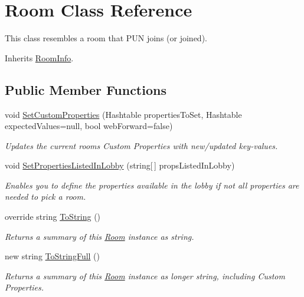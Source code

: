 \hypertarget{class_room}{}\section{Room Class Reference}
\label{class_room}


This class resembles a room that P\+UN joins (or joined).  




Inherits \hyperlink{class_room_info}{Room\+Info}.

\subsection*{Public Member Functions}
\begin{DoxyCompactItemize}
\item 
void \hyperlink{class_room_a9f8ac164f4f24be4140221b72792250a}{Set\+Custom\+Properties} (Hashtable properties\+To\+Set, Hashtable expected\+Values=null, bool web\+Forward=false)
\begin{DoxyCompactList}\small\item\em Updates the current room\textquotesingle{}s Custom Properties with new/updated key-\/values. \end{DoxyCompactList}\item 
void \hyperlink{class_room_af3c714b645bb569f4b7f060a985dbf1a}{Set\+Properties\+Listed\+In\+Lobby} (string\mbox{[}$\,$\mbox{]} props\+Listed\+In\+Lobby)
\begin{DoxyCompactList}\small\item\em Enables you to define the properties available in the lobby if not all properties are needed to pick a room. \end{DoxyCompactList}\item 
override string \hyperlink{class_room_ac193e5eddc588b1642b4de892d71082f}{To\+String} ()
\begin{DoxyCompactList}\small\item\em Returns a summary of this \hyperlink{class_room}{Room} instance as string. \end{DoxyCompactList}\item 
new string \hyperlink{class_room_a6f07e076b19abab3c30d2d7ce484538e}{To\+String\+Full} ()
\begin{DoxyCompactList}\small\item\em Returns a summary of this \hyperlink{class_room}{Room} instance as longer string, including Custom Properties. \end{DoxyCompactList}\end{DoxyCompactItemize}
